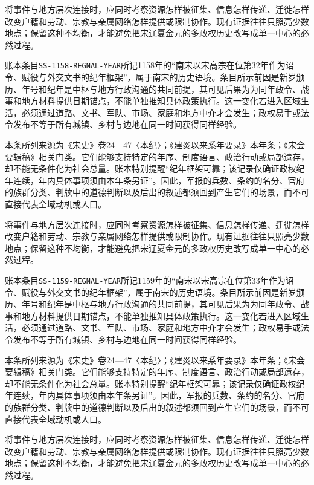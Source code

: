 将事件与地方层次连接时，应同时考察资源怎样被征集、信息怎样传递、迁徙怎样改变户籍和劳动、宗教与亲属网络怎样提供或限制协作。现有证据往往只照亮少数地点；保留这种不均衡，才能避免把宋辽夏金元的多政权历史改写成单一中心的必然过程。

账本条目\texttt{SS-1158-REGNAL-YEAR}所记1158年的“南宋以宋高宗在位第32年作为诏令、赋役与外交文书的纪年框架”，属于南宋的历史语境。条目所示前因是新岁颁历、年号和纪年是中枢与地方行政沟通的共同前提，其可见后果为为同年政令、战事和地方材料提供日期锚点，不能单独推知具体政策执行。这一变化若进入区域生活，必须通过道路、文书、军队、市场、家庭和地方中介才会发生；政权易手或法令发布不等于所有城镇、乡村与边地在同一时间获得同样经验。

本条所列来源为《宋史》卷24—47〈本纪〉；《建炎以来系年要录》本年条；《宋会要辑稿》相关门类。它们能够支持特定的年序、制度语言、政治行动或局部遗存，却不能无条件化为社会总量。账本特别提醒“纪年框架可靠；该记录仅确证政权纪年连续，年内具体事项须由本年条另证”。因此，军报的兵数、条约的名分、官府的族群分类、判牍中的道德判断以及后出的叙述都须回到产生它们的场景，而不可直接代表全域动机或人口。

将事件与地方层次连接时，应同时考察资源怎样被征集、信息怎样传递、迁徙怎样改变户籍和劳动、宗教与亲属网络怎样提供或限制协作。现有证据往往只照亮少数地点；保留这种不均衡，才能避免把宋辽夏金元的多政权历史改写成单一中心的必然过程。

账本条目\texttt{SS-1159-REGNAL-YEAR}所记1159年的“南宋以宋高宗在位第33年作为诏令、赋役与外交文书的纪年框架”，属于南宋的历史语境。条目所示前因是新岁颁历、年号和纪年是中枢与地方行政沟通的共同前提，其可见后果为为同年政令、战事和地方材料提供日期锚点，不能单独推知具体政策执行。这一变化若进入区域生活，必须通过道路、文书、军队、市场、家庭和地方中介才会发生；政权易手或法令发布不等于所有城镇、乡村与边地在同一时间获得同样经验。

本条所列来源为《宋史》卷24—47〈本纪〉；《建炎以来系年要录》本年条；《宋会要辑稿》相关门类。它们能够支持特定的年序、制度语言、政治行动或局部遗存，却不能无条件化为社会总量。账本特别提醒“纪年框架可靠；该记录仅确证政权纪年连续，年内具体事项须由本年条另证”。因此，军报的兵数、条约的名分、官府的族群分类、判牍中的道德判断以及后出的叙述都须回到产生它们的场景，而不可直接代表全域动机或人口。

将事件与地方层次连接时，应同时考察资源怎样被征集、信息怎样传递、迁徙怎样改变户籍和劳动、宗教与亲属网络怎样提供或限制协作。现有证据往往只照亮少数地点；保留这种不均衡，才能避免把宋辽夏金元的多政权历史改写成单一中心的必然过程。
